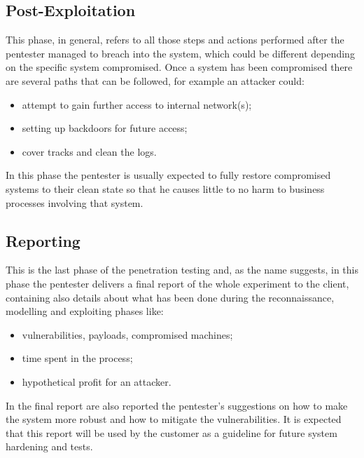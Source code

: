 \subsection{Post-Exploitation}
This phase, in general, refers to all those steps and actions performed after the pentester managed to breach into the system, which could be different depending on the specific system compromised. Once a system has been compromised there are several paths that can be followed, for example an attacker could:
\begin{itemize}
    \item attempt to gain further access to internal network(s);
    \item setting up backdoors for future access;
    \item cover tracks and clean the logs.
\end{itemize}
In this phase the pentester is usually expected to fully restore compromised systems to their clean state so that he causes little to no harm to business processes involving that system.

\subsection{Reporting}
This is the last phase of the penetration testing and, as the name suggests, in this phase the pentester delivers a final report of the whole experiment to the client, containing also details about what has been done during the reconnaissance, modelling and exploiting phases like:
\begin{itemize}
    \item vulnerabilities, payloads, compromised machines;
    \item time spent in the process;
    \item hypothetical profit for an attacker.
\end{itemize}
In the final report are also reported the pentester's suggestions on how to make the system more robust and how to mitigate the vulnerabilities. It is expected that this report will be used by the customer as a guideline for future system hardening and tests.

\clearpage